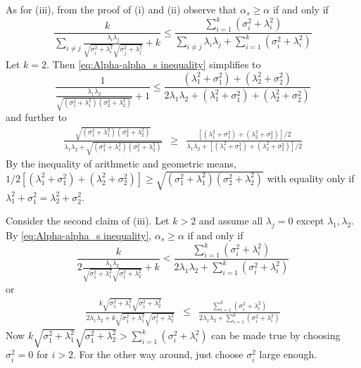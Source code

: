 \documentclass{article}
\makeatletter
\theoremstyle{plain}
\theoremstyle{plain}
\theoremstyle{definition}
\theoremstyle{remark}
\theoremstyle{definition}
\theoremstyle{plain}
\theoremstyle{plain}
\theoremstyle{definition}
\newenvironment{proof}[1][\protect\proofname]{\par
	\normalfont\topsep6\p@\@plus6\p@\relax
	\trivlist
	\itemindent\parindent
	\item[\hskip\labelsep\scshape #1]\ignorespaces
}{%
	\endtrivlist\@endpefalse
}
\providecommand{\proofname}{Proof}
\makeatother
\begin{document}
\begin{proof}[Proof of Proposition \ref{prop:Reliabilities.}]
As for (iii), from the proof of (i) and (ii) observe that $\alpha_{s}\geq\alpha$
if and only if
\begin{equation}
\label{eq:Alpha-alpha_s inequality}
\frac{k}{\sum_{i\neq j}\frac{\lambda_{i}\lambda_{j}}{\sqrt{\sigma_{i}^{2}+\lambda_{i}^{2}}\sqrt{\sigma_{j}^{2}+\lambda_{j}^{2}}}+k}\leq\frac{\sum_{i=1}^{k}\left(\sigma_{i}^{2}+\lambda_{i}^{2}\right)}{\sum_{i\neq j}\lambda_{i}\lambda_{j}+\sum_{i=1}^{k}\left(\sigma_{i}^{2}+\lambda_{i}^{2}\right)}
\end{equation}
Let $k=2$. Then \eqref{eq:Alpha-alpha_s inequality} simplifies to
\[
\frac{1}{\frac{\lambda_{1}\lambda_{2}}{\sqrt{\left(\sigma_{1}^{2}+\lambda_{1}^{2}\right)\left(\sigma_{2}^{2}+\lambda_{2}^{2}\right)}}+1}\leq\frac{\left(\lambda_{1}^{2}+\sigma_{1}^{2}\right)+\left(\lambda_{2}^{2}+\sigma_{2}^{2}\right)}{2\lambda_{1}\lambda_{2}+\left(\lambda_{1}^{2}+\sigma_{1}^{2}\right)+\left(\lambda_{2}^{2}+\sigma_{2}^{2}\right)}
\]
and further to
\begin{eqnarray*}
\frac{\sqrt{\left(\sigma_{1}^{2}+\lambda_{1}^{2}\right)\left(\sigma_{2}^{2}+\lambda_{2}^{2}\right)}}{\lambda_{1}\lambda_{2}+\sqrt{\left(\sigma_{1}^{2}+\lambda_{1}^{2}\right)\left(\sigma_{2}^{2}+\lambda_{2}^{2}\right)}} & \geq & \frac{\left[\left(\lambda_{1}^{2}+\sigma_{1}^{2}\right)+\left(\lambda_{2}^{2}+\sigma_{2}^{2}\right)\right]/2}{\lambda_{1}\lambda_{2}+\left[\left(\lambda_{1}^{2}+\sigma_{1}^{2}\right)+\left(\lambda_{2}^{2}+\sigma_{2}^{2}\right)\right]/2}
\end{eqnarray*}
By the inequality of arithmetic and geometric means, $1/2\left[\left(\lambda_{1}^{2}+\sigma_{1}^{2}\right)+\left(\lambda_{2}^{2}+\sigma_{2}^{2}\right)\right]\geq\sqrt{\left(\sigma_{1}^{2}+\lambda_{1}^{2}\right)\left(\sigma_{2}^{2}+\lambda_{2}^{2}\right)}$
with equality only if $\lambda_{1}^{2}+\sigma_{1}^{2}=\lambda_{2}^{2}+\sigma_{2}^{2}$.

Consider the second claim of (iii). Let $k>2$ and assume all $\lambda_{j}=0$
except $\lambda_{1},\lambda_{2}$. By \eqref{eq:Alpha-alpha_s inequality}, $\alpha_s \geq \alpha$ if and
only if
\[
\frac{k}{2\frac{\lambda_{1}\lambda_{2}}{\sqrt{\sigma_{1}^{2}+\lambda_{1}^{2}}\sqrt{\sigma_{1}^{2}+\lambda_{2}^{2}}}+k}<\frac{\sum_{i=1}^{k}\left(\sigma_{i}^{2}+\lambda_{i}^{2}\right)}{2\lambda_{1}\lambda_{2}+\sum_{i=1}^{k}\left(\sigma_{i}^{2}+\lambda_{i}^{2}\right)}
\]
or
\begin{eqnarray*}
\frac{k\sqrt{\sigma_{1}^{2}+\lambda_{1}^{2}}\sqrt{\sigma_{1}^{2}+\lambda_{2}^{2}}}{2\lambda_{1}\lambda_{2}+k\sqrt{\sigma_{1}^{2}+\lambda_{1}^{2}}\sqrt{\sigma_{1}^{2}+\lambda_{2}^{2}}} & \leq & \frac{\sum_{i=1}^{k}\left(\sigma_{i}^{2}+\lambda_{i}^{2}\right)}{2\lambda_{1}\lambda_{2}+\sum_{i=1}^{k}\left(\sigma_{i}^{2}+\lambda_{i}^{2}\right)}
\end{eqnarray*}
Now $k\sqrt{\sigma_{1}^{2}+\lambda_{1}^{2}}\sqrt{\sigma_{1}^{2}+\lambda_{2}^{2}}>\sum_{i=1}^{k}\left(\sigma_{i}^{2}+\lambda_{i}^{2}\right)$
can be made true by choosing $\sigma_{i}^{2}=0$ for $i>2$. For the
other way around, just choose $\sigma_{i}^{2}$ large enough.


\end{proof}
\end{document}
